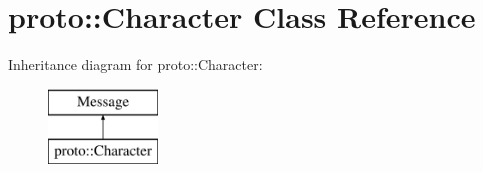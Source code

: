 \hypertarget{classproto_1_1_character}{}\section{proto\+:\+:Character Class Reference}
\label{classproto_1_1_character}
Inheritance diagram for proto\+:\+:Character\+:\begin{figure}[H]
\begin{center}
\leavevmode
\includegraphics[height=2.000000cm]{classproto_1_1_character}
\end{center}
\end{figure}
